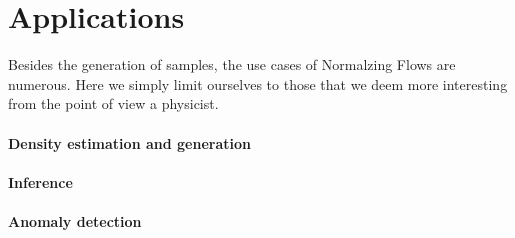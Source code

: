 \section{Applications}

Besides the generation of samples, the use cases of Normalzing Flows are numerous. 
Here we simply limit ourselves to those that we deem more interesting from the point of view a physicist.

\paragraph{Density estimation and generation}

\paragraph{Inference}

\paragraph{Anomaly detection}
